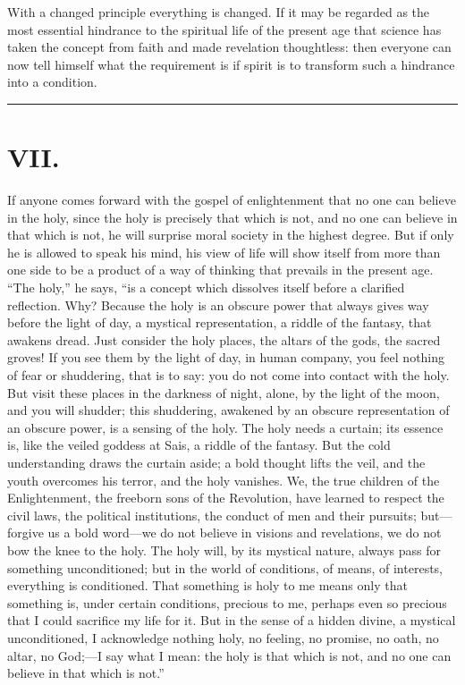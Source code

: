 \documentclass[12pt]{book}
\newcommand{\opage}[1]{\marginnote{\footnotesize\textit{[#1]}}}
\begin{document}
With a changed principle everything is changed. If it may be regarded as
the most essential hindrance to the spiritual life of the present age
that science has taken the concept from faith and made revelation
thoughtless: then everyone can now tell himself what the requirement is
if spirit is to transform such a hindrance into a condition.

\begin{center}\rule{3cm}{0.4pt}\end{center}

\chapter*{VII.}
\label{ch:vii}
\opage{105}\setcounter{footnote}{0}%
If anyone comes forward with the gospel of enlightenment that no one can
believe in the holy, since the holy is precisely that which is not, and
no one can believe in that which is not, he will surprise moral society
in the highest degree. But if only he is allowed to speak his mind, his
view of life will show itself from more than one side to be a product of
a way of thinking that prevails in the present age. ``The holy,'' he
says, ``is a concept which dissolves itself before a clarified
reflection. Why? Because the holy is an obscure power that always gives
way before the light of day, a mystical representation, a riddle of the
fantasy, that awakens dread. Just consider the holy places, the altars
of the gods, the sacred groves! If you see them by the light of day, in
human company, you feel nothing of fear or shuddering, that is to say:
you do not come into contact with the holy. But visit these places in
the darkness of night, alone, by the light of the moon, and you will
shudder; this shuddering, awakened by an obscure representation of an
obscure power, is a sensing of the holy. The holy needs a curtain; its
essence is, like the veiled goddess at Sais, a riddle of the fantasy.
But the cold understanding draws the curtain aside; a bold thought lifts
the veil, and the youth overcomes his
\opage{106}\setcounter{footnote}{0}%
terror, and the holy vanishes. We, the true children of the
Enlightenment, the freeborn sons of the Revolution, have learned to
respect the civil laws, the political institutions, the conduct of men
and their pursuits; but---forgive us a bold word---we do not believe in
visions and revelations, we do not bow the knee to the holy. The holy
will, by its mystical nature, always pass for something unconditioned;
but in the world of conditions, of means, of interests, everything is
conditioned. That something is holy to me means only that something is,
under certain conditions, precious to me, perhaps even so precious that
I could sacrifice my life for it. But in the sense of a hidden divine, a
mystical unconditioned, I acknowledge nothing holy, no feeling, no
promise, no oath, no altar, no God;---I say what I mean: the holy is
that which is not, and no one can believe in that which is not.''
\end{document}

